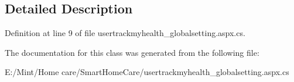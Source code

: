 \subsection{Detailed Description}


Definition at line 9 of file usertrackmyhealth\-\_\-globalsetting.\-aspx.\-cs.



The documentation for this class was generated from the following file\-:\begin{DoxyCompactItemize}
\item 
E\-:/\-Mint/\-Home care/\-Smart\-Home\-Care/usertrackmyhealth\-\_\-globalsetting.\-aspx.\-cs\end{DoxyCompactItemize}
